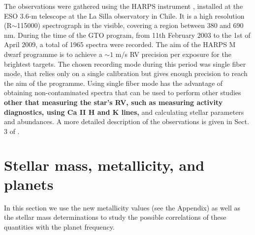 \documentclass[structabstract]{aa}
\begin{document}

The observations were gathered using the HARPS instrument \citep{Mayor-2003b,Pepe-2004}, installed at the ESO 3.6-m telescope at the La Silla observatory in Chile. It is a high resolution (R$\sim$115000) spectrograph in the visible, covering a region between 380 and 690 nm. During the time of the GTO program, from 11th February 2003 to the 1st of April 2009, a total of 1965 spectra were recorded. The aim of the HARPS M dwarf programme is to achieve a $\sim 1$ m/s RV precision per exposure for the brightest targets. The chosen recording mode during this period was single fiber mode, that relies only on a single calibration but gives enough precision to reach the aim of the programme. Using single fiber mode has the advantage of obtaining non-contaminated spectra that can be used to perform other studies \textbf{other that measuring the star's RV, such as measuring activity diagnostics, using Ca II H and K lines,} and calculating stellar parameters and abundances. A more detailed description of the observations is given in Sect. 3 of \citet{Bonfils-2011}.

\section{Stellar mass, metallicity, and planets}
\label{relation}

In this section we use the new metallicity values (see the Appendix) as well as the stellar mass determinations to study the possible correlations of these quantities with the planet frequency. 




\end{document}
